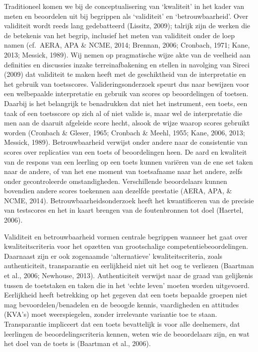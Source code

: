 \documentclass[
  letterpaper,
]{report}
\begin{document}
Traditioneel komen we bij de conceptualisering van `kwaliteit' in het
kader van meten en beoordelen uit bij begrippen als `validiteit' en
`betrouwbaarheid'. Over validiteit wordt reeds lang gedebatteerd
(Lissitz, 2009); talrijk zijn de werken die de betekenis van het begrip,
inclusief het meten van validiteit onder de loep namen (cf.~AERA, APA \&
NCME, 2014; Brennan, 2006; Cronbach, 1971; Kane, 2013; Messick, 1989).
Wij nemen op pragmatische wijze akte van de veelheid aan definities en
discussies inzake terreinafbakening en stellen in navolging van Sireci
(2009) dat validiteit te maken heeft met de geschiktheid van de
interpretatie en het gebruik van toetsscores. Valideringsonderzoek
speurt dus naar bewijzen voor een welbepaalde interpretatie en gebruik
van scores op beoordelingen of toetsen. Daarbij is het belangrijk te
benadrukken dat niet het instrument, een toets, een taak of een
toetsscore op zich al of niet valide is, maar wel de interpretatie die
men aan de daaruit afgeleide score hecht, alsook de wijze waarop scores
gebruikt worden (Cronbach \& Gleser, 1965; Cronbach \& Meehl, 1955;
Kane, 2006, 2013; Messick, 1989). Betrouwbaarheid verwijst onder andere
naar de consistentie van scores over replicaties van een toets of
beoordelingen heen. De aard en kwaliteit van de respons van een leerling
op een toets kunnen variëren van de ene set taken naar de andere, of van
het ene moment van toetsafname naar het andere, zelfs onder
gecontroleerde omstandigheden. Verschillende beoordelaars kunnen
bovendien andere scores toekennen aan dezelfde prestatie (AERA, APA, \&
NCME, 2014). Betrouwbaarheidsonderzoek heeft het kwantificeren van de
precisie van testscores en het in kaart brengen van de foutenbronnen tot
doel (Haertel, 2006).

Validiteit en betrouwbaarheid vormen centrale begrippen wanneer het gaat
over kwaliteitscriteria voor het opzetten van grootschalige
competentiebeoordelingen. Daarnaast zijn er ook zogenaamde
`alternatieve' kwaliteitscriteria, zoals authenticiteit, transparantie
en eerlijkheid niet uit het oog te verliezen (Baartman et al., 2006;
Newhouse, 2013). Authenticiteit verwijst naar de graad van gelijkenis
tussen de toetstaken en taken die in het `echte leven' moeten worden
uitgevoerd. Eerlijkheid heeft betrekking op het gegeven dat een toets
bepaalde groepen niet mag bevoordelen/benadelen en de beoogde kennis,
vaardigheden en attitudes (KVA's) moet weerspiegelen, zonder irrelevante
variantie toe te staan. Transparantie impliceert dat een toets
bevattelijk is voor alle deelnemers, dat leerlingen de
beoordelingscriteria kennen, weten wie de beoordelaars zijn, en wat het
doel van de toets is (Baartman et al., 2006).
\end{document}
